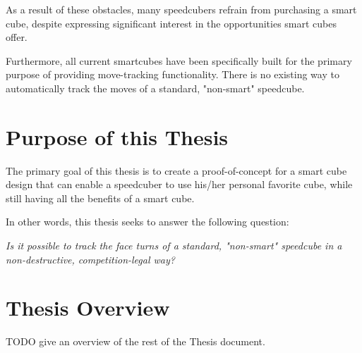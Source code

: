 As a result of these obstacles, many speedcubers refrain from purchasing a smart cube, despite expressing significant interest in the opportunities smart cubes offer.

Furthermore, all current smartcubes have been specifically built for the primary purpose of providing move-tracking functionality.
There is no existing way to automatically track the moves of a standard, "non-smart" speedcube.


\section{Purpose of this Thesis}

The primary goal of this thesis is to create a proof-of-concept for a smart cube design that can enable a speedcuber to use his/her personal favorite cube, while still having all the benefits of a smart cube. 

In other words, this thesis seeks to answer the following question:

\emph{Is it possible to track the face turns of a standard, "non-smart" speedcube in a non-destructive, competition-legal way?}

\section{Thesis Overview}
TODO give an overview of the rest of the Thesis document.